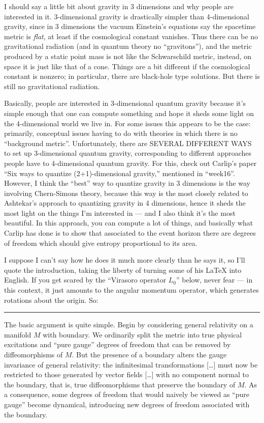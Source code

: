 \documentclass{article}
\begin{document}
I should say a little bit about gravity in 3 dimensions and why people
are interested in it. 3-dimensional gravity is drastically simpler than
4-dimensional gravity, since in 3 dimensions the vacuum Einstein's
equations say the spacetime metric is \emph{flat}, at least if the
cosmological constant vanishes. Thus there can be no gravitational
radiation (and in quantum theory no ``gravitons''), and the metric
produced by a static point mass is not like the Schwarschild metric,
instead, on space it is just like that of a cone. Things are a bit
different if the cosmological constant is nonzero; in particular, there
are black-hole type solutions. But there is still no gravitational
radiation.

Basically, people are interested in 3-dimensional quantum gravity
because it's simple enough that one can compute something and hope it
sheds some light on the 4-dimensional world we live in. For some issues
this appears to be the case: primarily, conceptual issues having to do
with theories in which there is no ``background metric''. Unfortunately,
there are SEVERAL DIFFERENT WAYS to set up 3-dimensional quantum
gravity, corresponding to different approaches people have to
4-dimensional quantum gravity. For this, check out Carlip's paper ``Six
ways to quantize (2+1)-dimensional gravity,'' mentioned in ``week16''.
However, I think the ``best'' way to quantize gravity in 3 dimensions is
the way involving Chern-Simons theory, because this way is the most
closely related to Ashtekar's approach to quantizing gravity in 4
dimensions, hence it sheds the most light on the things I'm interested
in --- and I also think it's the most beautiful. In this approach, you
can compute a lot of things, and basically what Carlip has done is to
show that associated to the event horizon there are degrees of freedom
which should give entropy proportional to its area.

I suppose I can't say how he does it much more clearly than he says it,
so I'll quote the introduction, taking the liberty of turning some of
his LaTeX into English. If you get scared by the ``Virasoro operator
\(L_0\)'' below, never fear --- in this context, it just amounts to the
angular momentum operator, which generates rotations about the origin.
So:

\begin{center}\rule{0.5\linewidth}{0.5pt}\end{center}

The basic argument is quite simple. Begin by considering general
relativity on a manifold \(M\) with boundary. We ordinarily split the
metric into true physical excitations and ``pure gauge'' degrees of
freedom that can be removed by diffeomorphisms of \(M\). But the
presence of a boundary alters the gauge invariance of general
relativity: the infinitesimal transformations {[}\ldots{]} must now be
restricted to those generated by vector fields {[}\ldots{]} with no
component normal to the boundary, that is, true diffeomorphisms that
preserve the boundary of \(M\). As a consequence, some degrees of
freedom that would naively be viewed as ``pure gauge'' become dynamical,
introducing new degrees of freedom associated with the boundary.
\end{document}
